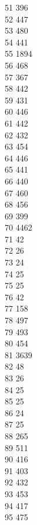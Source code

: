 { 51	396 \\
 52	447 \\
 53	480 \\
 54	441 \\
 55	1894 \\
 56	468 \\
 57	367 \\
 58	442 \\
 59	431 \\
 60	446 \\
 61	442 \\
 62	432 \\
 63	454 \\
 64	446 \\
 65	441 \\
 66	440 \\
 67	460 \\
 68	456 \\
 69	399 \\
 70	4462 \\
 71	42 \\
 72	26 \\
 73	24 \\
 74	25 \\
 75	25 \\
 76	42 \\
 77	158 \\
 78	497 \\
 79	493 \\
 80	454 \\
 81	3639 \\
 82	48 \\
 83	26 \\
 84	25 \\
 85	25 \\
 86	24 \\
 87	25 \\
 88	265 \\
 89	511 \\
 90	416 \\
 91	403 \\
 92	432 \\
 93	453 \\
 94	417 \\
 95	475 \\
}

